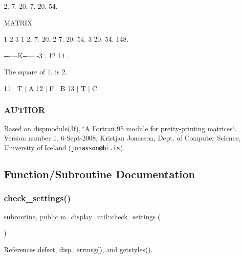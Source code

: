 2. 7. 20. 7. 20. 54. \begin{DoxyVerb}   MATRIX
\end{DoxyVerb}
 

 1 2 3 1 2. 7. 20. 2 7. 20. 54. 3 20. 54. 148.

-\/-\/-\/---K-\/-\/--- -\/3 . 12 14 .

The square of 1. is 2.

11 $\vert$ T $\vert$ A 12 $\vert$ F $\vert$ B 13 $\vert$ T $\vert$ C

\subsubsection*{A\+U\+T\+H\+OR}

Based on dispmodule(3f), \char`\"{}\+A Fortran 95 module for pretty-\/printing matrices\char`\"{}. Version number 1. 6-\/\+Sept-\/2008, Kristjan Jonasson, Dept. of Computer Science, University of Iceland (\href{mailto:jonasson@hi.is}{\tt jonasson@hi.\+is}). 

\subsection{Function/\+Subroutine Documentation}
\mbox{\label{namespacem__display__util_ad15e85a03cd2a7ef8f405fbb9c1061af}} 
\subsubsection{\texorpdfstring{check\+\_\+settings()}{check\_settings()}}
{\footnotesize\ttfamily \hyperlink{M__stopwatch_83_8txt_acfbcff50169d691ff02d4a123ed70482}{subroutine}, \hyperlink{M__stopwatch_83_8txt_a2f74811300c361e53b430611a7d1769f}{public} m\+\_\+display\+\_\+util\+::check\+\_\+settings (\begin{DoxyParamCaption}{ }\end{DoxyParamCaption})}



References defset, disp\+\_\+errmsg(), and getstyles().

\mbox{\label{namespacem__display__util_acc9b3b8faeba5d61ec46d3d76c161d27}} 
